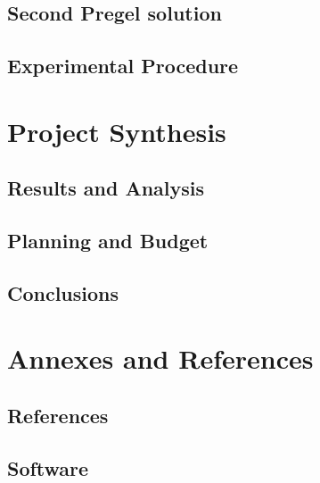 \documentclass{legrand}
\begin{document}
\chapter{Second Pregel solution}
\label{chapter:second}


\chapter{Experimental Procedure}
\label{chapter:experiment}


\part{Project Synthesis}

\chapter{Results and Analysis}
\label{chapter:results}


\chapter{Planning and Budget}
\label{chapter:planning}


\chapter{Conclusions}
\label{chapter:conclusions}


\part{Annexes and References}

\chapter{References} %
\printbibliography[heading=bibempty]


\appendix
\chapter{Software}


\printnoidxglossaries
\end{document}
